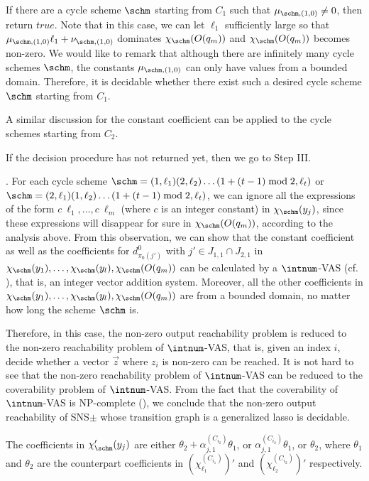 If there are a cycle scheme $\schm$ starting from $C_1$ such that $\mu_{\schm,(1,0)} \neq 0$, then return $true$. Note that in this case, we can let $\ell_1$ sufficiently large so that $\mu_{\schm,(1,0)} \ell_1 + \nu_{\schm,(1,0)}$ dominates $\chi_{\schm}(O(q_m))$ and $\chi_{\schm}(O(q_m))$ becomes non-zero. We would like to remark that although there are infinitely many cycle schemes $\schm$, the constants $\mu_{\schm,(1,0)}$ can only have values from a bounded domain. Therefore, it is decidable whether there exist such a desired cycle scheme $\schm$ starting from $C_1$.

A similar discussion for the constant coefficient can be applied to the cycle schemes starting from $C_2$.

If the decision procedure has not returned yet, then we go to Step III. 

\smallskip

. For each cycle scheme $\schm=(1,\ell_1) (2,\ell_2) \dots (1+ (t-1) \bmod 2,\ell_t)$ or $\schm=(2,\ell_1) (1,\ell_2) \dots (1+ (t-1) \bmod 2,\ell_t)$, we can ignore all the expressions of the form $c\ \ell_1,\dots, c\ \ell_m$ (where $c$ is an integer constant) in $\chi_{\schm}(y_j)$, since these expressions will disappear for sure in $\chi_{\schm}(O(q_m))$, according to the analysis above. From this observation, we can show that the constant coefficient as well as the coefficients for $d^0_{\pi_0(j')}$ with $j' \in J_{1,1} \cap J_{2,1}$ in $\chi_{\schm}(y_1),\dots,\chi_{\schm}(y_l), \chi_{\schm}(O(q_m))$ can be calculated by a $\intnum$-VAS (cf. \cite{HH14}), that is, an integer vector addition system. Moreover, all the other coefficients in $\chi_{\schm}(y_1),\dots,\chi_{\schm}(y_l), \chi_{\schm}(O(q_m))$ are from a bounded domain, no matter how long the scheme $\schm$ is.  

Therefore, in this case, the non-zero output reachability problem is reduced to the non-zero reachability problem of $\intnum$-VAS, that is, given an index $i$, decide whether a vector $\vec{z}$ where $z_i$ is non-zero can be reached.  It is not hard to see that the non-zero reachability problem of $\intnum$-VAS can be reduced to the coverability problem of $\intnum$-VAS. From the fact that the coverability of $\intnum$-VAS is NP-complete (\cite{HH14}),  we conclude that the non-zero output reachability of SNS$\pm$ whose transition graph is a generalized lasso is decidable.




The coefficients in $\chi'_{\schm}(y_j)$ are either $\theta_2 + \alpha^{(C_{i_2})}_{j,1}\theta_1 $, or $\alpha^{(C_{i_2})}_{j,1}\theta_1$, or $\theta_2$, where $\theta_1$ and $\theta_2$ are the counterpart coefficients in $(\chi^{(C_{i_1})}_{\ell_1})'$ and $(\chi^{(C_{i_2})}_{\ell_2})'$ respectively.

